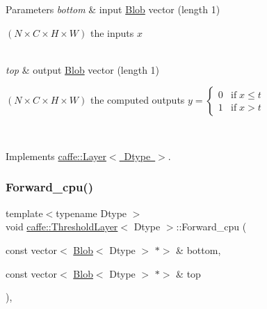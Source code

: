 \begin{DoxyParams}{Parameters}
{\em bottom} & input \mbox{\hyperlink{classcaffe_1_1_blob}{Blob}} vector (length 1)
\begin{DoxyEnumerate}
\item $ (N \times C \times H \times W) $ the inputs $ x $ 
\end{DoxyEnumerate}\\
\hline
{\em top} & output \mbox{\hyperlink{classcaffe_1_1_blob}{Blob}} vector (length 1)
\begin{DoxyEnumerate}
\item $ (N \times C \times H \times W) $ the computed outputs $ y = \left\{ \begin{array}{lr} 0 & \mathrm{if} \; x \le t \\ 1 & \mathrm{if} \; x > t \end{array} \right. $ 
\end{DoxyEnumerate}\\
\hline
\end{DoxyParams}


Implements \mbox{\hyperlink{classcaffe_1_1_layer_a576ac6a60b1e99fe383831f52a6cea77}{caffe\+::\+Layer$<$ Dtype $>$}}.

\mbox{\label{classcaffe_1_1_threshold_layer_a7aa846dd532cfeb41b09671bd975d120}} 
\subsubsection{\texorpdfstring{Forward\+\_\+cpu()}{Forward\_cpu()}\hspace{0.1cm}{\footnotesize\ttfamily [2/2]}}
{\footnotesize\ttfamily template$<$typename Dtype $>$ \\
void \mbox{\hyperlink{classcaffe_1_1_threshold_layer}{caffe\+::\+Threshold\+Layer}}$<$ Dtype $>$\+::Forward\+\_\+cpu (\begin{DoxyParamCaption}\item[{const vector$<$ \mbox{\hyperlink{classcaffe_1_1_blob}{Blob}}$<$ Dtype $>$ $\ast$$>$ \&}]{bottom,  }\item[{const vector$<$ \mbox{\hyperlink{classcaffe_1_1_blob}{Blob}}$<$ Dtype $>$ $\ast$$>$ \&}]{top }\end{DoxyParamCaption})\hspace{0.3cm}{\ttfamily [protected]}, {\ttfamily [virtual]}}


